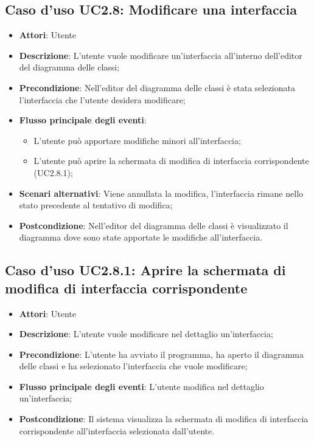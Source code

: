 \documentclass[../AnalisiDeiRequisiti.tex]{subfiles}
\begin{document}
		\subsection{Caso d'uso UC2.8: Modificare una interfaccia}
		\begin{itemize}
			\item \textbf{Attori}: Utente
			\item \textbf{Descrizione}: L'utente vuole modificare un'interfaccia all'interno dell'editor del diagramma delle classi;
			\item \textbf{Precondizione}: Nell'editor del diagramma delle classi è stata selezionata l'interfaccia che l'utente desidera modificare;
			\item \textbf{Flusso principale degli eventi}: \begin{itemize}
				\item L'utente può apportare modifiche minori all'interfaccia;
				\item L'utente può aprire la schermata di modifica di interfaccia corrispondente (UC2.8.1);
			\end{itemize}
			\item \textbf{Scenari alternativi}: Viene annullata la modifica, l'interfaccia rimane nello stato precedente al tentativo di modifica;
			\item \textbf{Postcondizione}: Nell'editor del diagramma delle classi è visualizzato il diagramma dove sono state apportate le modifiche all'interfaccia.
		\end{itemize}
		\subsection{Caso d'uso UC2.8.1: Aprire la schermata di modifica di interfaccia corrispondente}
		\begin{itemize}
			\item \textbf{Attori}: Utente
			\item \textbf{Descrizione}: L'utente vuole modificare nel dettaglio un'interfaccia;
			\item \textbf{Precondizione}: L'utente ha avviato il programma, ha aperto il diagramma delle classi e ha selezionato l'interfaccia che vuole modificare;
			\item \textbf{Flusso principale degli eventi}: L'utente modifica nel dettaglio un'interfaccia;
			\item \textbf{Postcondizione}: Il sistema visualizza la schermata di modifica di interfaccia corrispondente all'interfaccia selezionata dall'utente.
		\end{itemize}
\end{document}

